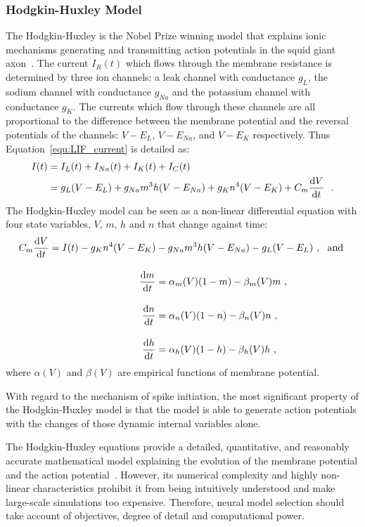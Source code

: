 \subsubsection{Hodgkin-Huxley Model}
The Hodgkin-Huxley is the Nobel Prize winning model that explains ionic mechanisms generating and transmitting action potentials in the squid giant axon~\citep{hodgkin1952quantitative}.
The current $I_R(t)$ which flows through the membrane resistance is determined by three ion channels: a leak channel with conductance $g_L$, the sodium channel with conductance $g_{Na}$ and the potassium channel with conductance $g_{K}$.
The currents which flow through these channels are all proportional to the difference between the membrane potential and the reversal potentials of the channels: $V-E_L$, $V-E_{Na}$, and $V-E_{K}$ respectively.
Thus Equation~\ref{equ:LIF_current} is detailed as:
\begin{equation}
\begin{aligned}
I(t) &= I_L(t) + I_{Na}(t) + I_{K}(t)+ I_C(t) \\
&= g_L(V-E_L) + g_{Na}m^3h(V-E_{Na}) + g_{K}n^4(V-E_{K})  + C_m \dfrac{\mathrm{d} V}{\mathrm{d} t}~~.
\end{aligned}
\label{equ:HH_current}
\end{equation}
The Hodgkin-Huxley model can be seen as a non-linear differential equation with four state variables, $V$, $m$, $h$ and $n$ that change against time:
\begin{equation}
\begin{aligned}
C_m \dfrac{\mathrm{d} V}{\mathrm{d} t} = I(t) - g_{K}n^4(V-E_{K}) &- g_{Na}m^3h(V-E_{Na}) - g_L(V-E_L)~, \textrm{~~and }\\[10pt]
\dfrac{\mathrm{d} m}{\mathrm{d} t} &= \alpha_m(V)(1-m) - \beta_m(V)m~, \\[10pt]
\dfrac{\mathrm{d} n}{\mathrm{d} t} &= \alpha_n(V)(1-n) - \beta_n(V)n~, \\[10pt]
\dfrac{\mathrm{d} h}{\mathrm{d} t} &= \alpha_h(V)(1-h) - \beta_h(V)h~,
\end{aligned}
\end{equation} 
where $\alpha(V)$ and  $\beta(V)$ are empirical functions of membrane potential.

With regard to the mechanism of spike initiation, the most significant property of the Hodgkin-Huxley model is that the model is able to generate action potentials with the changes of those dynamic internal variables alone.

The Hodgkin-Huxley equations provide a detailed, quantitative, and reasonably accurate mathematical model explaining the evolution of the membrane potential and the action potential~\citep{byrne2014molecules}.
However, its numerical complexity and highly non-linear characteristics prohibit it from being intuitively understood and make large-scale simulations too expensive.
Therefore, neural model selection should take account of objectives, degree of detail and computational power.


